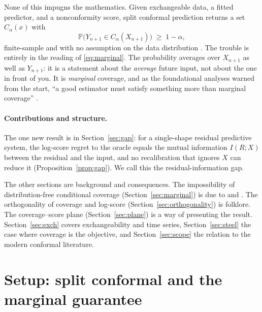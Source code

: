 \documentclass[11pt]{article}
\theoremstyle{definition}
\renewcommand{\Pr}{\mathbb{P}}
\begin{document}
None of this impugns the mathematics. Given exchangeable data, a fitted predictor,
and a nonconformity score, split conformal prediction returns a set $C_\alpha(x)$ with
\begin{equation}\label{eq:marginal}
  \Pr\!\big(Y_{n+1}\in C_\alpha(X_{n+1})\big)\;\ge\;1-\alpha,
\end{equation}
finite-sample and with no assumption on the data distribution
\citep{vovk2005algorithmic,lei2018distribution,angelopoulos2023gentle}. The trouble
is entirely in the reading of \eqref{eq:marginal}. The probability averages over
$X_{n+1}$ as well as $Y_{n+1}$: it is a statement about the \emph{average} future
input, not about the one in front of you. It is \emph{marginal} coverage, and as the
foundational analyses warned from the start, ``a good estimator must satisfy something
more than marginal coverage'' \citep{lei2014distribution}.

\paragraph{Contributions and structure.}
The one new result is in Section~\ref{sec:gap}: for a single-shape residual predictive
system, the log-score regret to the oracle equals the mutual information $I(R;X)$ between
the residual and the input, and no recalibration that ignores $X$ can reduce it
(Proposition~\ref{prop:gap}). We call this the residual-information gap.

The other sections are background and consequences. The impossibility of distribution-free
conditional coverage (Section~\ref{sec:marginal}) is due to \citet{lei2014distribution} and
\citet{barber2021limits}. The orthogonality of coverage and log-score
(Section~\ref{sec:orthogonality}) is folklore. The coverage--score plane
(Section~\ref{sec:plane}) is a way of presenting the result. Section~\ref{sec:exch} covers
exchangeability and time series, Section~\ref{sec:steel} the case where coverage is the
objective, and Section~\ref{sec:scope} the relation to the modern conformal literature.

\section{Setup: split conformal and the marginal guarantee}\label{sec:setup}
\end{document}
